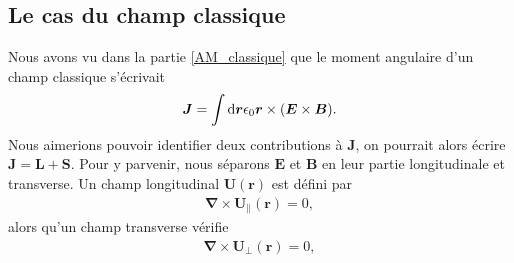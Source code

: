 \subsection{Le cas du champ classique}
Nous avons vu dans la partie \ref{AM_classique} que le moment angulaire d'un champ classique s'écrivait 
\begin{equation*}
\bm{J}=\int{\mathrm{d}\bm{r}\epsilon_0\bm{r}\times(\bm{E}\times\bm{B})}.
\end{equation*} 
Nous aimerions pouvoir identifier deux contributions à $\bm{J}$, on pourrait alors écrire $\bm{J}=\bm{L}+\bm{S}$. Pour y parvenir, nous séparons $\bm{E}$ et $\bm{B}$ en leur partie longitudinale et transverse. Un champ longitudinal $\bm{U}(\bm{r})$ est défini par 
\begin{align*}
\bm{\nabla}\times\bm{U_{\parallel}}(\bm{r})=0,
\end{align*}
alors qu'un champ transverse vérifie 
\begin{align*}
\bm{\nabla}\times\bm{U_{\bot}}(\bm{r})=0,
\end{align*}












